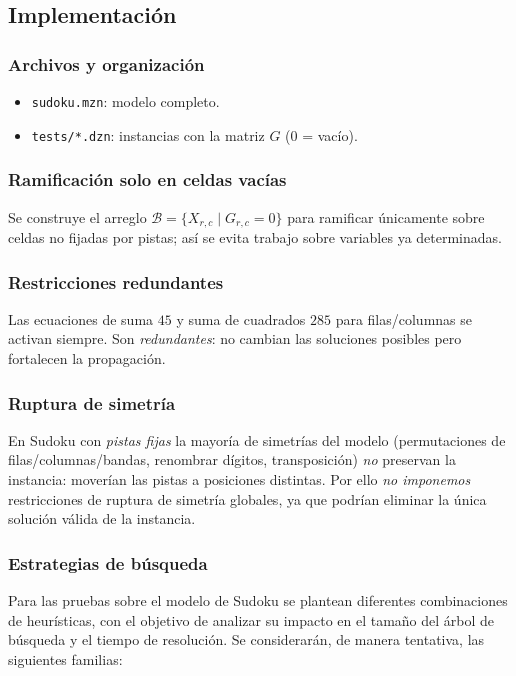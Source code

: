 
\subsection{Implementación}\label{sec:implementacion}

\subsubsection*{Archivos y organización}
\begin{itemize}
  \item \texttt{sudoku.mzn}: modelo completo.
  \item \texttt{tests/*.dzn}: instancias con la matriz \(G\) (0 = vacío).
\end{itemize}

\subsubsection*{Ramificación solo en celdas vacías}
Se construye el arreglo \(\mathcal{B}=\{X_{r,c}\mid G_{r,c}=0\}\) para ramificar únicamente sobre celdas no fijadas por pistas; así se evita trabajo sobre variables ya determinadas.

\subsubsection*{Restricciones redundantes}
Las ecuaciones de suma \(45\) y suma de cuadrados \(285\) para filas/columnas se activan siempre. Son \emph{redundantes}: no cambian las soluciones posibles pero fortalecen la propagación.

\subsubsection*{Ruptura de simetría}
En Sudoku con \emph{pistas fijas} la mayoría de simetrías del modelo (permutaciones de filas/columnas/bandas, renombrar dígitos, transposición) \emph{no} preservan la instancia: moverían las pistas a posiciones distintas. Por ello \emph{no imponemos} restricciones de ruptura de simetría globales, ya que podrían eliminar la única solución válida de la instancia.

\subsubsection*{Estrategias de búsqueda}
Para las pruebas sobre el modelo de Sudoku se plantean diferentes combinaciones de heurísticas, con el objetivo de analizar su impacto en el tamaño del árbol de búsqueda y el tiempo de resolución. Se considerarán, de manera tentativa, las siguientes familias:

